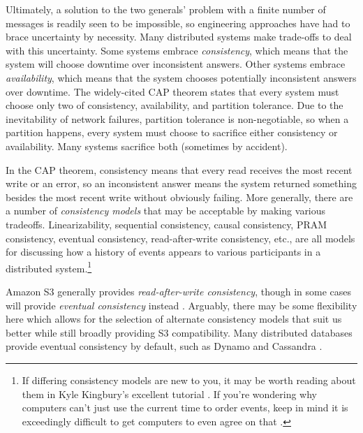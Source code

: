 \documentclass[a4paper,10pt]{article} \usepackage[utf8]{inputenc}
\begin{document}
Ultimately, a solution to the two generals' problem with a finite number of
messages is readily seen to be impossible, so engineering approaches have had
to brace uncertainty by necessity. Many distributed systems make trade-offs to
deal with this uncertainty. Some systems embrace {\em consistency}, which means
that the system will choose downtime over inconsistent answers. Other
systems embrace {\em availability}, which means that the system chooses
potentially inconsistent answers over downtime. The widely-cited CAP
theorem \cite{cap} states that every system must choose only two of consistency,
availability, and partition tolerance. Due to the inevitability of network
failures, partition tolerance is non-negotiable, so when a partition happens,
every system must choose to sacrifice either consistency or availability. Many
systems sacrifice both (sometimes by accident).

In the CAP theorem, consistency means that every read receives the most recent
write or an error, so an inconsistent answer means the system returned something
besides the most recent write without obviously failing. More generally, there
are a number of {\em consistency models} that may be acceptable by making
various tradeoffs. Linearizability, sequential consistency, causal consistency,
PRAM consistency, eventual consistency, read-after-write consistency, etc., are
all models for discussing how a history of events appears to various
participants in a distributed system.\footnote{If differing consistency models
are new to you, it may be worth reading about them in Kyle Kingbury's excellent
tutorial \cite{aphyr-consistency}. If you're wondering why computers can't just
use the current time to order events, keep in mind it is exceedingly difficult
to get computers to even agree on that \cite{no-now}.}

Amazon S3 generally provides {\em read-after-write consistency}, though in some
cases will provide {\em eventual consistency} instead \cite{s3-consistency}.
Arguably, there may be some flexibility here which allows for the selection 
of alternate consistency models that suit us better while still broadly
providing S3 compatibility. 
Many distributed databases provide eventual consistency by
default, such as Dynamo \cite{dynamo} and Cassandra \cite{cassandra}.
\end{document}
